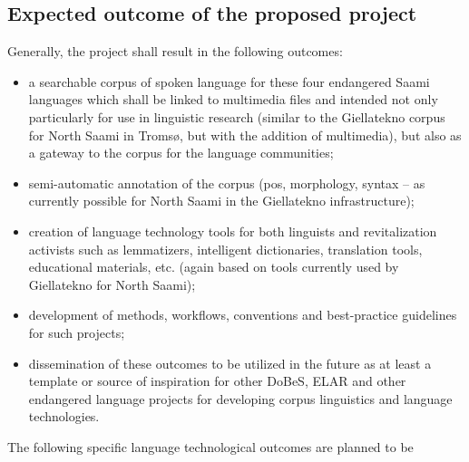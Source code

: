 \documentclass[a4paper,12pt]{article}
\begin{document}
%




\subsection{Expected outcome of the proposed project}%
Generally, the project shall result in the following outcomes:
\begin{itemize}
\item a searchable corpus of spoken language for these four endangered Saami languages which shall be linked to multimedia files and intended not only particularly for use in linguistic research (similar to the Giellatekno corpus for North Saami in Tromsø, but with the addition of multimedia), but also as a gateway to the corpus for the language communities;
\item semi-automatic annotation of the corpus (pos, morphology, syntax – as currently possible for North Saami in the Giellatekno infrastructure);
\item creation of language technology tools for both linguists and revitalization activists such as lemmatizers, intelligent dictionaries, translation tools, educational materials, etc. (again based on tools currently used by Giellatekno for North Saami); 
\item development of methods, workflows, conventions and best-practice guidelines for such projects;
\item dissemination of these outcomes to be utilized in the future as at least a template or source of inspiration for other DoBeS, ELAR and other endangered language projects for developing corpus linguistics and language technologies.
\end{itemize}
The following specific language technological outcomes are planned to be %
\end{document}
